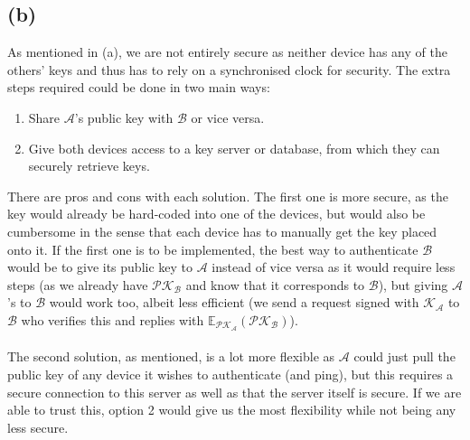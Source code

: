 \documentclass{article}
\begin{document}
\subsection*{(b)}
As mentioned in (a), we are not entirely secure as neither device has any of the others' keys and thus has to rely on a synchronised clock for security. The extra steps required could be done in two main ways:
\begin{enumerate}
    \item Share $\mathcal{A}$'s public key with $\mathcal{B}$ or vice versa.
    \item Give both devices access to a key server or database, from which they can securely retrieve keys.
\end{enumerate}
There are pros and cons with each solution. The first one is more secure, as the key would already be hard-coded into one of the devices, but would also be cumbersome in the sense that each device has to manually get the key placed onto it. If the first one is to be implemented, the best way to authenticate $\mathcal{B}$ would be to give its public key to $\mathcal{A}$ instead of vice versa as it would require less steps (as we already have $\mathcal{PK_B}$ and know that it corresponds to $\mathcal{B}$), but giving $\mathcal{A}$'s to $\mathcal{B}$ would work too, albeit less efficient (we send a request signed with $\mathcal{K_A}$ to $\mathcal{B}$ who verifies this and replies with $\mathbb{E}_\mathcal{PK_A}(\mathcal{PK_B})$).%
\\
\\
The second solution, as mentioned, is a lot more flexible as $\mathcal{A}$ could just pull the public key of any device it wishes to authenticate (and ping), but this requires a secure connection to this server as well as that the server itself is secure. If we are able to trust this, option 2 would give us the most flexibility while not being any less secure.
\end{document}
